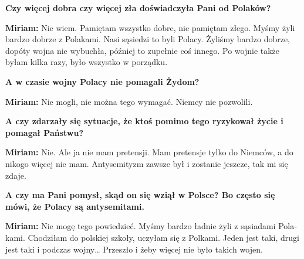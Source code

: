 \begin{otherlanguage}{ngerman}
\textbf{Czy więcej dobra czy więcej zła doświadczyła Pani od Polaków?} 

\textbf{Miriam:} Nie wiem. Pamiętam wszystko dobre, nie pamiętam złego. Myśmy żyli bardzo dobrze z Polakami. Nasi sąsiedzi to byli Polacy. Żyliśmy bardzo dobrze, dopóty wojna nie wybuchła, później to zupełnie coś innego. Po wojnie także byłam kilka razy, było wszystko w porządku. 

\textbf{A w czasie wojny Polacy nie pomagali Żydom?}

\textbf{Miriam:}  Nie mogli, nie można tego wymagać. Niemcy nie pozwolili. 

\textbf{A czy zdarzały się sytuacje, że ktoś pomimo tego ryzykował życie i pomagał Państwu?} 

\textbf{Miriam:}  Nie. Ale ja nie mam pretensji. Mam pretensje tylko do Niemców, a do nikogo więcej nie mam. Antysemityzm zawsze był i zostanie jeszcze, tak mi się zdaje. 

\textbf{A czy ma Pani pomysł, skąd on się wziął w Polsce? Bo często się mówi, że Polacy są antysemitami.} 

\textbf{Miriam:} Nie mogę tego powiedzieć. Myśmy bardzo ładnie żyli z sąsiadami Polakami. Chodziłam do polskiej szkoły, uczyłam się z Polkami. Jeden jest taki, drugi jest taki i podczas wojny… Przeszło i żeby więcej nie było takich wojen. 
\end{otherlanguage}